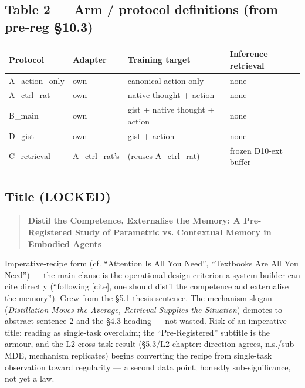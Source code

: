 \subsection*{Table 2 --- Arm / protocol definitions (from pre-reg \S10.3)}

\begin{table}[h]
\centering
\begin{tabular}{l l l l}
\toprule
Protocol & Adapter & Training target & Inference retrieval \\
\midrule
A\_action\_only & own & canonical action only & none \\
A\_ctrl\_rat & own & native thought + action & none \\
B\_main & own & gist + native thought + action & none \\
D\_gist & own & gist + action & none \\
C\_retrieval & A\_ctrl\_rat's & (reuses A\_ctrl\_rat) & frozen D10-ext buffer \\
\bottomrule
\end{tabular}
\end{table}

\subsection*{Title (LOCKED)}

\begin{quote}
\textbf{Distil the Competence, Externalise the Memory:
A Pre-Registered Study of Parametric vs. Contextual Memory in
Embodied Agents}
\end{quote}

Imperative-recipe form (cf. ``Attention Is All You Need'', ``Textbooks
Are All You Need'') --- the main clause is the operational design
criterion a system builder can cite directly (``following [cite], one
should distil the competence and externalise the memory''). Grew from
the \S5.1 thesis sentence. The mechanism slogan (\emph{Distillation Moves the
Average, Retrieval Supplies the Situation}) demotes to abstract
sentence 2 and the \S4.3 heading --- not wasted. Risk of an
imperative title: reading as single-task overclaim; the ``Pre-Registered''
subtitle is the armour, and the L2 cross-task result (\S5.3/L2 chapter:
direction agrees, n.s./sub-MDE, mechanism replicates) begins converting
the recipe from single-task observation toward regularity --- a second data
point, honestly sub-significance, not yet a law.
